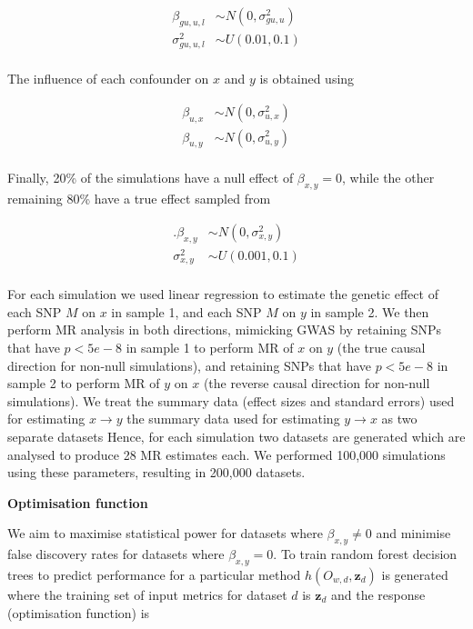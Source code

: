 \documentclass[]{article}
\begin{document}
\[
\begin{aligned}
\beta_{gu,u,l} & \sim N(0, \sigma^2_{gu,u}) \\
\sigma^2_{gu,u,l} & \sim U(0.01, 0.1) \\
\end{aligned}
\]

The influence of each confounder on \(x\) and \(y\) is obtained using

\[
\begin{aligned}
\beta_{u,x} & \sim N(0, \sigma^{2}_{u,x}) \\
\beta_{u,y} & \sim N(0, \sigma^{2}_{u,y}) \\
\end{aligned}
\]

Finally, 20\% of the simulations have a null effect of
\(\beta_{x,y} = 0\), while the other remaining 80\% have a true effect
sampled from

\[
\begin{aligned}.
\beta_{x,y} & \sim N(0, \sigma^2_{x,y}) \\
\sigma^2_{x,y} & \sim U(0.001, 0.1) \\
\end{aligned}
\]

For each simulation we used linear regression to estimate the genetic
effect of each SNP \(M\) on \(x\) in sample 1, and each SNP \(M\) on
\(y\) in sample 2. We then perform MR analysis in both directions,
mimicking GWAS by retaining SNPs that have \(p < 5e-8\) in sample 1 to
perform MR of \(x\) on \(y\) (the true causal direction for non-null
simulations), and retaining SNPs that have \(p < 5e-8\) in sample 2 to
perform MR of \(y\) on \(x\) (the reverse causal direction for non-null
simulations). We treat the summary data (effect sizes and standard
errors) used for estimating \(x \rightarrow y\) the summary data used
for estimating \(y \rightarrow x\) as two separate datasets Hence, for
each simulation two datasets are generated which are analysed to produce
28 MR estimates each. We performed 100,000 simulations using these
parameters, resulting in 200,000 datasets.

\textbf{Optimisation function}

We aim to maximise statistical power for datasets where
\(\beta_{x,y} \neq 0\) and minimise false discovery rates for datasets
where \(\beta_{x,y} = 0\). To train random forest decision trees to
predict performance for a particular method
\(h(O_{w,d}, \textbf{z}_{d})\) is generated where the training set of
input metrics for dataset \(d\) is \(\textbf{z}_{d}\) and the response
(optimisation function) is
\end{document}
